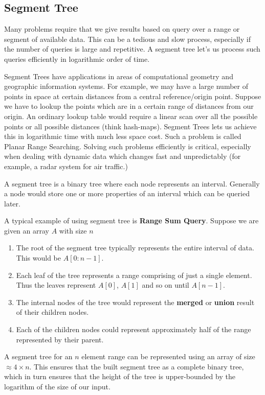 \subsection{Segment Tree}
Many problems require that we give results based on query over a range or segment of available data. This can be a tedious and slow process, especially if the number of queries is large and repetitive. A segment tree let's us process such queries efficiently in logarithmic order of time.

Segment Trees have applications in areas of computational geometry and geographic information systems. For example, we may have a large number of points in space at certain distances from a central reference/origin point. Suppose we have to lookup the points which are in a certain range of distances from our origin. An ordinary lookup table would require a linear scan over all the possible points or all possible distances (think hash-maps). Segment Trees lets us achieve this in logarithmic time with much less space cost. Such a problem is called Planar Range Searching. Solving such problems efficiently is critical, especially when dealing with dynamic data which changes fast and unpredictably (for example, a radar system for air traffic.)

A segment tree is a binary tree where each node represents an interval. Generally a node would store one or more properties of an interval which can be queried later.

A typical example of using segment tree is \textbf{Range Sum Query}. Suppose we are given an array $A$ with size $n$

\begin{enumerate}
\item The root of the segment tree typically represents the entire interval of data. This would be $A[0:n-1]$.
\item Each leaf of the tree represents a range comprising of just a single element. Thus the leaves represent $A[0]$, $A[1]$ and so on until $A[n-1]$.
\item The internal nodes of the tree would represent the \textbf{merged} or \textbf{union} result of their children nodes.
\item Each of the children nodes could represent approximately half of the range represented by their parent.
\end{enumerate}

A segment tree for an $n$ element range can be represented using an array of size $\approx 4\times n$. This ensures that the built segment tree as a complete binary tree, which in turn ensures that the height of the tree is upper-bounded by the logarithm of the size of our input.

